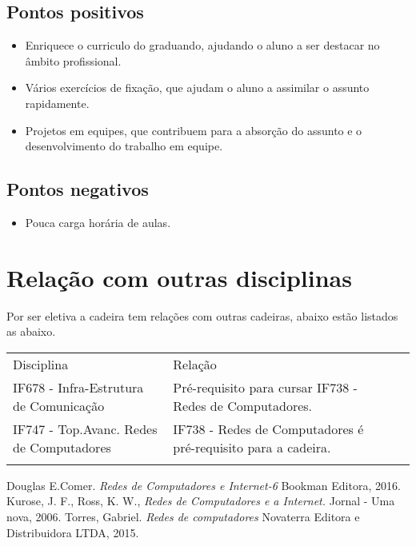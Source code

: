 \documentclass[10pt,a4paper]{article}
\begin{document}
\subsection{Pontos positivos}
\begin{itemize}
\item Enriquece o curriculo do graduando, ajudando o aluno a ser destacar no âmbito profissional.
\item Vários exercícios de fixação, que ajudam o aluno a assimilar o assunto rapidamente.
\item Projetos em equipes, que contribuem para a absorção do assunto e o desenvolvimento do trabalho em equipe. 
\end{itemize}
\subsection{Pontos negativos}
\begin{itemize}
\item Pouca carga horária de aulas.
\end{itemize}

\section{Relação com outras disciplinas}
Por ser eletiva a cadeira tem relações com outras cadeiras, abaixo estão listados as abaixo.

\begin{tabular}{lllll}
\cline{1-2}
\multicolumn{1}{|l|}{Disciplina}                               & \multicolumn{1}{l|}{Relação}                                                       &  &  &  \\ \cline{1-2}
\multicolumn{1}{|l|}{IF678 - Infra-Estrutura de Comunicação}   & \multicolumn{1}{l|}{Pré-requisito para cursar IF738 - Redes de Computadores.}      &  &  &  \\ \cline{1-2}
\multicolumn{1}{|l|}{IF747 - Top.Avanc. Redes de Computadores} & \multicolumn{1}{l|}{IF738 - Redes de Computadores é pré-requisito para a cadeira.} &  &  &  \\ \cline{1-2}
                                                               &                                                                                    &  &  & 
\end{tabular}

\begin{thebibliography}{11}
Douglas E.Comer.
\textit{Redes de Computadores e Internet-6}
Bookman Editora, 2016.
  Kurose, J. F., Ross, K. W.,
\textit{Redes de Computadores e a Internet.}
  Jornal - Uma nova,
  2006.
Torres, Gabriel.
\textit{Redes de computadores}
Novaterra Editora e Distribuidora LTDA, 2015.
\end{thebibliography}
\end{document}
